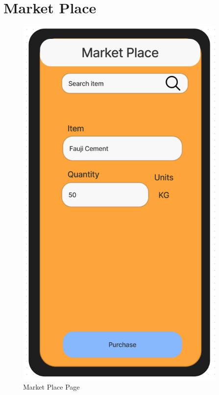 \documentclass[title page]{article}
\begin{document}
\section{Market Place}
\begin{figure}[!h]
    \begin{center}
          \includegraphics[height=19cm]{marketplace.png}
          \caption{Market Place Page}
          \label{fig:marketplace}
    \end{center}
\end{figure}
\end{document}
